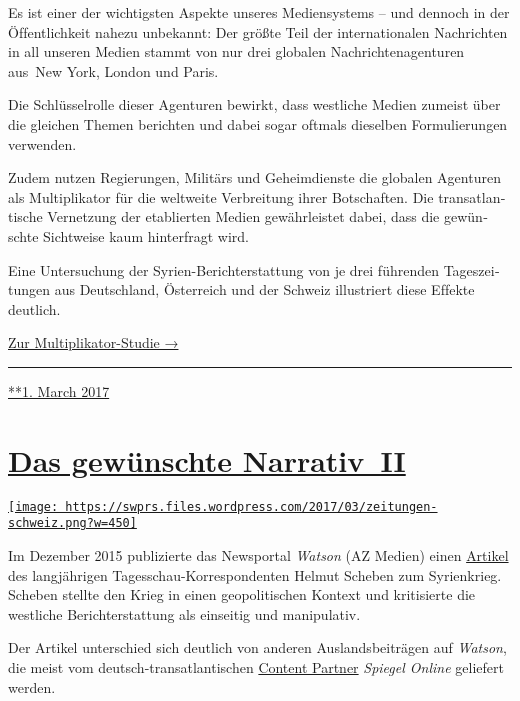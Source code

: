 Es ist einer der wichtigsten Aspekte unseres Medien­systems -- und
dennoch in der Öf‌fent­lich­keit nahezu unbekannt: Der größte Teil der
inter­na­tio­nalen Nach­rich­ten in all unseren Medien stammt von nur
drei glo­balen Nach­rich­ten­agen­turen aus~New York, London und Paris.

Die Schlüssel­rolle dieser Agen­turen be­wirkt, dass west­liche Medien
zu­meist über die glei­chen The­men be­richten und dabei sogar oftmals
dieselben For­mu­lie­rungen ver­wenden.

Zu­dem nutzen Re­gie­rungen, Mi­li­tärs und Ge­heim­dienste die
glo­balen Agen­turen als Mul­ti­pli­kator für die welt­weite
Ver­brei­tung ihrer Bot­schaf‌ten. Die trans­at­lan­tische Ver­netzung
der eta­blier­ten Medien ge­währ­leis­tet da­bei, dass die ge­wün­schte
Sicht­weise kaum hin­ter­fragt wird.

Eine Unter­suchung der Syrien-Bericht­er­stat­tung von je drei
füh­ren­den Tages­zei­tungen aus Deutsch­land, Öster­reich und der
Schweiz illus­triert diese Ef‌fekte deutlich.

\href{https://swprs.org/der-propaganda-multiplikator/}{Zur
Multiplikator-Studie →}

\begin{center}\rule{0.5\linewidth}{\linethickness}\end{center}

\href{https://swprs.org/2017/03/01/propaganda-multiplikator/}{**1. March
2017}

\hypertarget{das-gewuxfcnschte-narrativ-ii}{%
\section{\texorpdfstring{\href{https://swprs.org/2017/03/01/das-gewuenschte-narrativ-ii/}{Das
gewünschte
Narrativ~II}}{Das gewünschte Narrativ~II}}\label{das-gewuxfcnschte-narrativ-ii}}

\href{https://swprs.org/2017/03/01/das-gewuenschte-narrativ-ii/}{\texttt{[image: https://swprs.files.wordpress.com/2017/03/zeitungen-schweiz.png?w=450]}}

Im Dezember 2015 publi­zierte das News­portal \emph{Watson} (AZ Medien)
einen \href{https://www.watson.ch/!148360008}{Artikel} des lang­jährigen
Tages­schau-Kor­res­pon­denten Hel­mut Sche­­ben zum Syrien­krieg.
Scheben stellte den Krieg in einen geo­po­li­tischen Kontext und
kri­ti­sierte die westliche Be­richt­er­stattung als einseitig und
ma­ni­pu­la­tiv.

Der Artikel un­ter­schied sich deutlich von anderen Aus­lands­bei­trägen
auf \emph{Watson}, die meist vom deutsch-transatlantischen
\href{https://www.watson.ch/Corporate/articles/502582965-Spiegel-Online-und-watson-machen-gemeinsame-Sache}{Content
Partner} \emph{Spiegel Online} geliefert werden.

